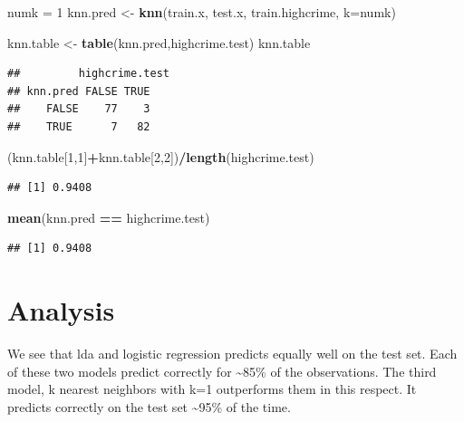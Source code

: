\documentclass[
]{article}
\newenvironment{Shaded}{\begin{snugshade}}{\end{snugshade}}
\newcommand{\DataTypeTok}[1]{\textcolor[rgb]{0.13,0.29,0.53}{#1}}
\newcommand{\DecValTok}[1]{\textcolor[rgb]{0.00,0.00,0.81}{#1}}
\newcommand{\KeywordTok}[1]{\textcolor[rgb]{0.13,0.29,0.53}{\textbf{#1}}}
\newcommand{\NormalTok}[1]{#1}
\newcommand{\OperatorTok}[1]{\textcolor[rgb]{0.81,0.36,0.00}{\textbf{#1}}}
\newcommand{\StringTok}[1]{\textcolor[rgb]{0.31,0.60,0.02}{#1}}
\begin{document}
\begin{Shaded}
\begin{Highlighting}[]
\NormalTok{numk =}\StringTok{ }\DecValTok{1}
\NormalTok{knn.pred <-}\StringTok{ }\KeywordTok{knn}\NormalTok{(train.x, }
\NormalTok{                test.x,}
\NormalTok{                train.highcrime,}
                \DataTypeTok{k=}\NormalTok{numk)}

\NormalTok{knn.table <-}\StringTok{ }\KeywordTok{table}\NormalTok{(knn.pred,highcrime.test)}
\NormalTok{knn.table}
\end{Highlighting}
\end{Shaded}

\begin{verbatim}
##         highcrime.test
## knn.pred FALSE TRUE
##    FALSE    77    3
##    TRUE      7   82
\end{verbatim}

\begin{Shaded}
\begin{Highlighting}[]
\NormalTok{(knn.table[}\DecValTok{1}\NormalTok{,}\DecValTok{1}\NormalTok{]}\OperatorTok{+}\NormalTok{knn.table[}\DecValTok{2}\NormalTok{,}\DecValTok{2}\NormalTok{])}\OperatorTok{/}\KeywordTok{length}\NormalTok{(highcrime.test)}
\end{Highlighting}
\end{Shaded}

\begin{verbatim}
## [1] 0.9408
\end{verbatim}

\begin{Shaded}
\begin{Highlighting}[]
\KeywordTok{mean}\NormalTok{(knn.pred }\OperatorTok{==}\StringTok{ }\NormalTok{highcrime.test)}
\end{Highlighting}
\end{Shaded}

\begin{verbatim}
## [1] 0.9408
\end{verbatim}

\hypertarget{analysis}{%
\section{Analysis}\label{analysis}}

We see that lda and logistic regression predicts equally well on the
test set. Each of these two models predict correctly for
\textasciitilde85\% of the observations. The third model, k nearest
neighbors with k=1 outperforms them in this respect. It predicts
correctly on the test set \textasciitilde95\% of the time.
\end{document}
